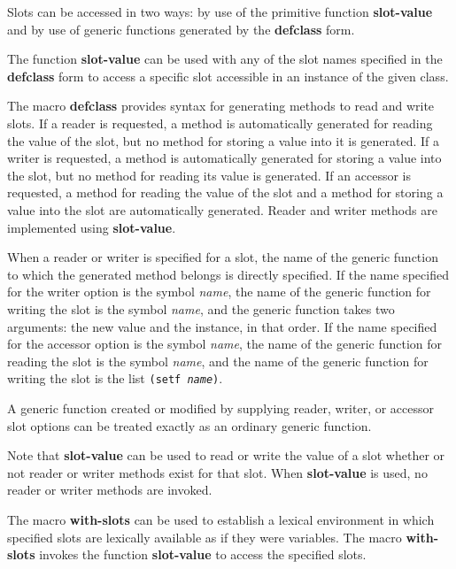 \endsubSection%


Slots can be accessed in two ways: by use of the primitive function
{\bf slot-value} and by use of generic functions generated by the {\bf
defclass} form.

The function {\bf slot-value} can be used with any of the slot names
specified in the {\bf defclass} form to access a specific slot
accessible in an instance of the given class.

The macro {\bf defclass} provides syntax for generating methods to
read and write slots.  If a {\bit reader\/} is requested, a method is
automatically generated for reading the value of the slot, but no
method for storing a value into it is generated.  If a {\bit writer\/}
is requested, a method is automatically generated for storing a value
into the slot, but no method for reading its value is generated.  If
an {\bit accessor\/} is requested, a method for reading the value of
the slot and a method for storing a value into the slot are
automatically generated.  Reader and writer methods are implemented
using {\bf slot-value}.

When a reader or writer is specified for a slot, the name of the
generic function to which the generated method belongs is directly
specified.  If the name specified for the writer option is the symbol
{\it name}, the name of the generic function for writing the slot
is the symbol {\it name}, and the generic function takes two
arguments: the new value and the instance, in that order.  If the name
specified for the accessor option is the symbol {\it name}, the
name of the generic function for reading the slot is the symbol {\it
name\/}, and the name of the generic function for writing the slot is
the list {\tt (setf {\it name\/})}.

A generic function created or modified by supplying reader, writer, or
accessor slot options can be treated exactly as an ordinary generic
function.

Note that {\bf slot-value} can be used to read or write the value of a
slot whether or not reader or writer methods exist for that slot.
When {\bf slot-value} is used, no reader or writer methods are
invoked.

The macro {\bf with-slots} can be used to establish a lexical
environment in which specified slots are lexically available as if they
were variables.  The macro {\bf with-slots} invokes the function {\bf
slot-value} to access the specified slots.

